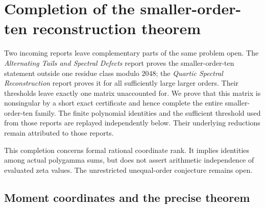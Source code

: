 
\section{Completion of the smaller-order-ten reconstruction theorem}
\label{mt10:section}

Two incoming reports leave complementary parts of the same problem open.
The \emph{Alternating Tails and Spectral Defects} report \cite{RepoAlternating} proves the
smaller-order-ten statement outside one residue class modulo $2048$;
the \emph{Quartic Spectral Reconstruction} report \cite{RepoQuartic} proves it for all
sufficiently large larger orders. Their thresholds leave exactly one
matrix unaccounted for. We prove that this matrix is nonsingular by a
short exact certificate and hence complete the entire smaller-order-ten
family. The finite polynomial identities and the sufficient threshold
used from those reports are replayed independently below. Their
underlying reductions remain attributed to those reports.

This completion concerns formal rational coordinate rank. It implies
identities among actual polygamma sums, but does not assert arithmetic
independence of evaluated zeta values. The unrestricted unequal-order
conjecture remains open.

\subsection{Moment coordinates and the precise theorem}

